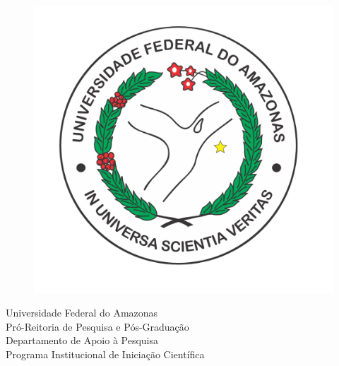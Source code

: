\newcommand*{\themonth}{\ifthenelse{\the\month < 2}{Janeiro }
                  {\ifthenelse{\the\month < 3}{Fevereiro }
                  {\ifthenelse{\the\month < 4}{Março }
                  {\ifthenelse{\the\month < 5}{Abril }
                  {\ifthenelse{\the\month < 6}{Maio }
                  {\ifthenelse{\the\month < 7}{Junho }
                  {\ifthenelse{\the\month < 8}{Julho }
                  {\ifthenelse{\the\month < 9}{Agosto }
                  {\ifthenelse{\the\month < 10}{Setembro }
                  {\ifthenelse{\the\month < 11}{Outubro }
                  {\ifthenelse{\the\month < 12}{Novembro }{Dezembro }}}}}}}}}}}}
                  

\begin{titlepage}
\begin{center}

	\vspace{-0.5cm}

  \begin{figure}[hbt!]
		\begin{center}
		   \includegraphics[scale=0.15]{Figuras/MarcaUFAM.png}
		\end{center}
	\end{figure}

  \large{Universidade Federal do Amazonas}\\
  \large{Pró-Reitoria de Pesquisa e Pós-Graduação}\\
  \large{Departamento de Apoio à Pesquisa}\\
  \large{Programa Institucional de Iniciação Científica}\\


\end{center}
\end{titlepage}

